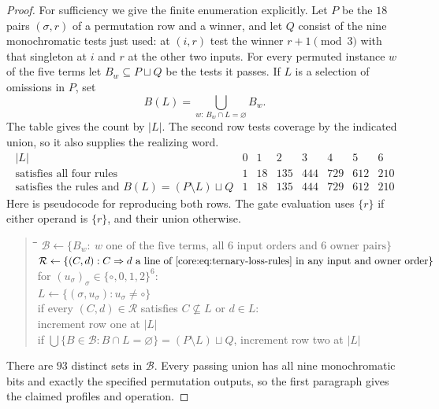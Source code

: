 \begin{proof}
For sufficiency we give the finite enumeration explicitly. Let $P$ be
the $18$ pairs $(\sigma,r)$ of a permutation row and a winner, and
let $Q$ consist of the nine monochromatic tests just used: at $(i,r)$
test the winner $r+1\pmod3$ with that singleton at $i$ and $r$ at
the other two inputs. For every permuted instance $w$ of the five
terms let $B_w\subseteq P\sqcup Q$ be the tests it passes. If $L$ is
a selection of omissions in $P$, set
\[
 B(L)=\bigcup_{w:\,B_w\cap L=\varnothing} B_w.
\]
The table gives the count by $|L|$. The second row tests coverage by
the indicated union, so it also supplies the realizing word.
\[
\begin{array}{c|rrrrrrr}
 |L|&0&1&2&3&4&5&6\\\hline
 \text{satisfies all four rules}&1&18&135&444&729&612&210\\
 \text{satisfies the rules and }B(L)=(P\setminus L)\sqcup Q
   &1&18&135&444&729&612&210
\end{array}
\]
Here is pseudocode for reproducing both rows. The gate evaluation uses
$\{r\}$ if either operand is $\{r\}$, and their union otherwise.
\begin{quote}\small
\begin{tabbing}
\hspace{1em}\=\hspace{1em}\=\hspace{1em}\=\kill
$\mathcal B\gets\{B_w:\ w\text{ one of the five terms, all }6
   \text{ input orders and }6\text{ owner pairs}\}$\\
$\mathcal R\gets\{(C,d): C\Rightarrow d\text{ a line of
   \eqref{core:eq:ternary-loss-rules} in any input and owner order}\}$\\
for $(u_\sigma)_\sigma\in\{\circ,0,1,2\}^{6}$:\\
\> $L\gets\{(\sigma,u_\sigma):u_\sigma\ne\circ\}$\\
\> if every $(C,d)\in\mathcal R$ satisfies $C\not\subseteq L$ or $d\in L$:\\
\>\> increment row one at $|L|$\\
\>\> if $\bigcup\{B\in\mathcal B:B\cap L=\varnothing\}
             =(P\setminus L)\sqcup Q$, increment row two at $|L|$
\end{tabbing}
\end{quote}
There are $93$ distinct sets in $\mathcal B$. Every passing union has
all nine monochromatic bits and exactly the specified permutation
outputs, so the first paragraph gives the claimed profiles and operation.
\end{proof}
